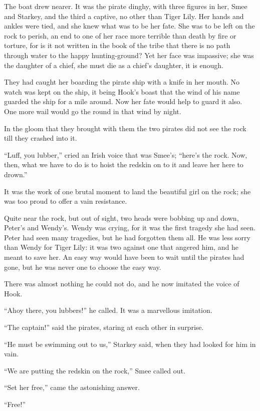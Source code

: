 The boat drew nearer. It was the pirate dinghy, with three figures in
her, Smee and Starkey, and the third a captive, no other than Tiger
Lily. Her hands and ankles were tied, and she knew what was to be her
fate. She was to be left on the rock to perish, an end to one of her
race more terrible than death by fire or torture, for is it not written
in the book of the tribe that there is no path through water to the
happy hunting-ground? Yet her face was impassive; she was the daughter
of a chief, she must die as a chief's daughter, it is enough.

They had caught her boarding the pirate ship with a knife in her mouth.
No watch was kept on the ship, it being Hook's boast that the wind of
his name guarded the ship for a mile around. Now her fate would help to
guard it also. One more wail would go the round in that wind by night.

In the gloom that they brought with them the two pirates did not see
the rock till they crashed into it.

``Luff, you lubber,'' cried an Irish voice that was Smee's; ``here's the
rock. Now, then, what we have to do is to hoist the redskin on to it
and leave her here to drown.''

It was the work of one brutal moment to land the beautiful girl on the
rock; she was too proud to offer a vain resistance.

Quite near the rock, but out of sight, two heads were bobbing up and
down, Peter's and Wendy's. Wendy was crying, for it was the first
tragedy she had seen. Peter had seen many tragedies, but he had
forgotten them all. He was less sorry than Wendy for Tiger Lily: it was
two against one that angered him, and he meant to save her. An easy way
would have been to wait until the pirates had gone, but he was never
one to choose the easy way.

There was almost nothing he could not do, and he now imitated the voice
of Hook.

``Ahoy there, you lubbers!'' he called. It was a marvellous imitation.

``The captain!'' said the pirates, staring at each other in surprise.

``He must be swimming out to us,'' Starkey said, when they had looked for
him in vain.

``We are putting the redskin on the rock,'' Smee called out.

``Set her free,'' came the astonishing answer.

``Free!''

